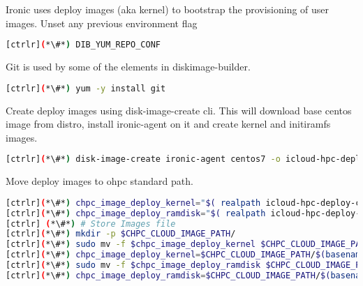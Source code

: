 Ironic uses deploy images (aka kernel) to bootstrap the provisioning of user images. 
Unset any previous environment flag


\begin{lstlisting}[language=bash,keywords={}]
[ctrlr](*\#*) DIB_YUM_REPO_CONF
\end{lstlisting} 


Git is used by some of the elements in diskimage-builder. 

\begin{lstlisting}[language=bash,keywords={}]
[ctrlr](*\#*) yum -y install git
\end{lstlisting} 


Create deploy images using disk-image-create cli. This will download base centos image from distro, install ironic-agent on it and create kernel and initiramfs images.

\begin{lstlisting}[language=bash,keywords={}]
[ctrlr](*\#*) disk-image-create ironic-agent centos7 -o icloud-hpc-deploy-c7
\end{lstlisting} 

Move deploy images to ohpc standard path.

\begin{lstlisting}[language=bash,keywords={}]
[ctrlr](*\#*) chpc_image_deploy_kernel="$( realpath icloud-hpc-deploy-c7.kernel)"
[ctrlr](*\#*) chpc_image_deploy_ramdisk="$( realpath icloud-hpc-deploy-c7.initramfs)"
[ctrlr] (*\#*) # Store Images file
[ctrlr](*\#*) mkdir -p $CHPC_CLOUD_IMAGE_PATH/
[ctrlr](*\#*) sudo mv -f $chpc_image_deploy_kernel $CHPC_CLOUD_IMAGE_PATH/
[ctrlr](*\#*) chpc_image_deploy_kernel=$CHPC_CLOUD_IMAGE_PATH/$(basename $chpc_image_deploy_kernel)
[ctrlr](*\#*) sudo mv -f $chpc_image_deploy_ramdisk $CHPC_CLOUD_IMAGE_PATH/
[ctrlr](*\#*) chpc_image_deploy_ramdisk=$CHPC_CLOUD_IMAGE_PATH/$(basename $chpc_image_deploy_ramdisk)
\end{lstlisting} 
